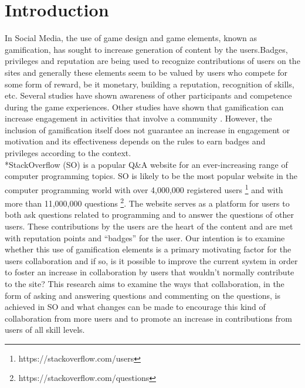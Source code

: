 \documentclass{sigchi}
\begin{document}

 

\section{Introduction}
In Social Media, the use of game design and game elements, known as gamification, has sought to increase generation of content by the users.Badges, privileges and reputation are being used to recognize contributions of users on the sites and generally these elements seem to be valued by users who compete for some form of reward, be it monetary, building a reputation, recognition of skills, etc. Several studies have shown awareness of other participants and competence during the game experiences\cite{Rughinis}. Other studies have shown that gamification can increase engagement in activities that involve a community \cite{Marder}. However, the inclusion of gamification itself does not guarantee an increase in engagement or motivation and its effectiveness depends on the rules to earn badges and privileges  according to the context\cite{Deterding}.
\\*StackOverflow (SO) is a popular Q\&A website for an ever-increasing range of computer programming topics. SO is likely to be the most popular website in the computer programming world with over 4,000,000 registered users \footnote{https://stackoverflow.com/users} and with more than 11,000,000 questions \footnote{https://stackoverflow.com/questions}. The website serves as a platform for users to both ask questions related to programming and to answer the questions of other users. These contributions by the users are the heart of the content and are met with reputation points and “badges” for the user. Our intention is to examine whether this use of gamification elements is a primary motivating factor for the users collaboration and if so, is it possible to improve the current system in order to foster an increase in collaboration by users that wouldn't normally contribute to the site? 
This research aims to examine the ways that collaboration, in the form of asking and answering questions and commenting on the questions, is achieved in SO and what changes can be made to encourage this kind of collaboration from more users and to promote an increase in contributions from users of all skill levels. 
\end{document}
